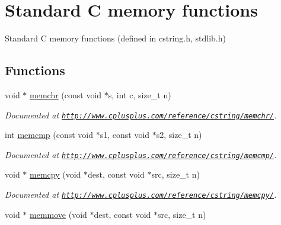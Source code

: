 \hypertarget{group__memory}{\section{Standard C memory functions}
\label{group__memory}
}


Standard C memory functions (defined in cstring.\-h, stdlib.\-h)  


\subsection*{Functions}
\begin{DoxyCompactItemize}
\item 
\hypertarget{group__memory_ga16d6b0bd660cc3f9910924c6b6f4af8e}{void $\ast$ \hyperlink{group__memory_ga16d6b0bd660cc3f9910924c6b6f4af8e}{memchr} (const void $\ast$s, int c, size\-\_\-t n)}\label{group__memory_ga16d6b0bd660cc3f9910924c6b6f4af8e}

\begin{DoxyCompactList}\small\item\em Documented at \href{http://www.cplusplus.com/reference/cstring/memchr/}{\tt http\-://www.\-cplusplus.\-com/reference/cstring/memchr/}. \end{DoxyCompactList}\item 
\hypertarget{group__memory_ga9e6df54ee04e18a3772335580e2ed872}{int \hyperlink{group__memory_ga9e6df54ee04e18a3772335580e2ed872}{memcmp} (const void $\ast$s1, const void $\ast$s2, size\-\_\-t n)}\label{group__memory_ga9e6df54ee04e18a3772335580e2ed872}

\begin{DoxyCompactList}\small\item\em Documented at \href{http://www.cplusplus.com/reference/cstring/memcmp/}{\tt http\-://www.\-cplusplus.\-com/reference/cstring/memcmp/}. \end{DoxyCompactList}\item 
void $\ast$ \hyperlink{group__memory_ga14938524dcbeb59d7117ba5e151ad1b1}{memcpy} (void $\ast$dest, const void $\ast$src, size\-\_\-t n)
\begin{DoxyCompactList}\small\item\em Documented at \href{http://www.cplusplus.com/reference/cstring/memcpy/}{\tt http\-://www.\-cplusplus.\-com/reference/cstring/memcpy/}. \end{DoxyCompactList}\item 
\hypertarget{group__memory_ga802c986820d3866639922b6bc9484f90}{void $\ast$ \hyperlink{group__memory_ga802c986820d3866639922b6bc9484f90}{memmove} (void $\ast$dest, const void $\ast$src, size\-\_\-t n)}\label{group__memory_ga802c986820d3866639922b6bc9484f90}


\end{DoxyCompactItemize}
